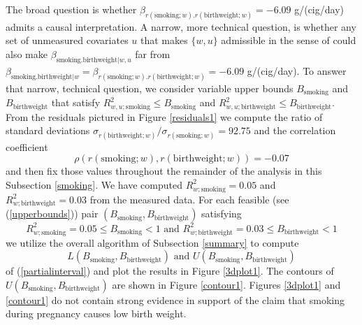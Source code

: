 \documentclass[11pt]{amsart}
\begin{document}
The broad question is whether $\beta_{r(\textrm{smoking};w).r(\textrm{birthweight};w)}=-6.09$ g/(cig/day) admits a causal interpretation. A narrow, more technical question, is whether any set of unmeasured covariates $u$ that makes $\{w,u\}$ admissible in the sense of \citep{Pearl2009} could also make $\beta_{\textrm{smoking.birthweight}|w,u}$ far from $\beta_{\textrm{smoking.birthweight}|w}=\beta_{r(\textrm{smoking};w).r(\textrm{birthweight};w)}=-6.09$ g/(cig/day). To answer that narrow, technical question, we consider variable upper bounds $B_{\textrm{smoking}}$ and $B_{\textrm{birthweight}}$ that satisfy $R^2_{w,u;\textrm{smoking}}\leq B_{\textrm{smoking}}$ and $R^2_{w,u;\textrm{birthweight}}\leq B_{\textrm{birthweight}}$. From the residuals pictured in Figure \ref{residuals1} we compute the ratio of standard deviations $\sigma_{r(\textrm{birthweight};w)}/\sigma_{r(\textrm{smoking};w)}= 92.75$ and the correlation coefficient \[\rho(r(\textrm{smoking};w),r(\textrm{birthweight};w))=-0.07\] and then fix those values throughout the remainder of the analysis in this Subsection \ref{smoking}. We have computed $R^2_{w;\textrm{smoking}}=0.05$ and $R^2_{w;\textrm{birthweight}}=0.03$ from the measured data. For each feasible (see (\ref{upperbounds})) pair $(B_{\textrm{smoking}},B_{\textrm{birthweight}})$ satisfying \[R^2_{w;\textrm{smoking}}=0.05\leq B_{\textrm{smoking}}<1\textrm{~and~}R^2_{w;\textrm{birthweight}}=0.03\leq B_{\textrm{birthweight}}<1\] we utilize the overall algorithm of Subsection \ref{summary} to compute \[L(B_{\textrm{smoking}}, B_\textrm{birthweight})\textrm{~and~}U(B_{\textrm{smoking}}, B_\textrm{birthweight})\] of (\ref{partialinterval}) and plot the results in Figure \ref{3dplot1}. The contours of $U(B_{\textrm{smoking}}, B_\textrm{birthweight})$ are shown in Figure \ref{contour1}. Figures \ref{3dplot1} and \ref{contour1} do not contain strong evidence in support of the claim that smoking during pregnancy causes low birth weight.

%




\end{document}
